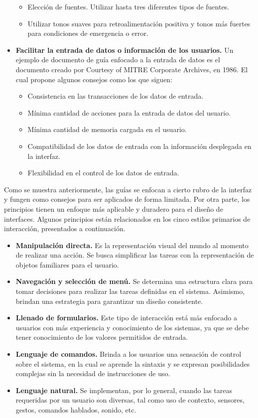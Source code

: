 \begin{itemize}
\begin{itemize}
    \item Elección de fuentes. Utilizar hasta tres diferentes tipos de fuentes.
    \item Utilizar tonos suaves para retroalimentación positiva y tonos más fuertes para condiciones de emergencia o error.
  \end{itemize}
  \item \textbf{Facilitar la entrada de datos o información de los usuarios.} Un ejemplo de documento de guía enfocado a la entrada de datos es el documento creado por Courtesy of MITRE Corporate Archives, en 1986. El cual propone algunos consejos como los que siguen:
  \begin{itemize}
    \item Consistencia en las transacciones de los datos de entrada.
    \item Mínima cantidad de acciones para la entrada de datos del usuario.
    \item Mínima cantidad de memoria cargada en el usuario.
    \item Compatibilidad de los datos de entrada con la información desplegada en la interfaz.
    \item Flexibilidad en el control de los datos de entrada.
  \end{itemize}
\end{itemize}

Como se muestra anteriormente, las guías se enfocan a cierto rubro de la interfaz y fungen como consejos para ser aplicados de forma limitada. Por otra parte, los principios tienen un enfoque más aplicable y duradero para el diseño de interfaces. Algunos principios están relacionados en los cinco estilos primarios de interacción, presentados a continuación.

\begin{itemize}
  \item \textbf{Manipulación directa.} Es la representación visual del mundo al momento de realizar una acción. Se busca simplificar las tareas con la representación de objetos familiares para el usuario.
  \item \textbf{Navegación y selección de menú.} Se determina una estructura clara para tomar decisiones para realizar las tareas definidas en el sistema. Asimismo, brindan una estrategia para garantizar un diseño consistente.
  \item \textbf{Llenado de formularios.} Este tipo de interacción está más enfocado a usuarios con más experiencia y conocimiento de los sistemas, ya que se debe tener conocimiento de los valores permitidos de entrada.
  \item \textbf{Lenguaje de comandos.} Brinda a los usuarios una sensación de control sobre el sistema, en la cual se aprende la sintaxis y se expresan posibilidades complejas sin la necesidad de instrucciones de uso.
  \item \textbf{Lenguaje natural.} Se implementan, por lo general, cuando las tareas requeridas por un usuario son diversas, tal como uso de contexto, sensores, gestos, comandos hablados, sonido, etc.
\end{itemize}

